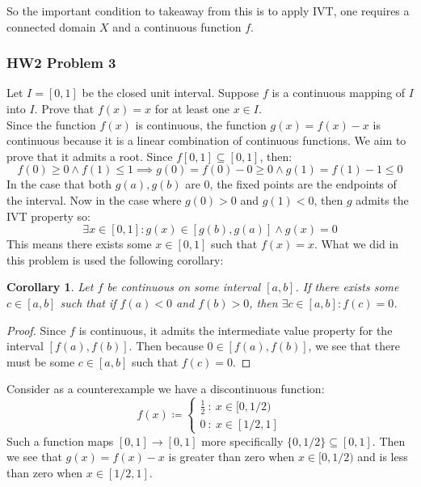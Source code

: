 \documentclass[10pt,letterpaper]{article} %
\newtheorem{cor}{Corollary}[section]
\begin{document}
So the important condition to takeaway from this is to apply IVT, one requires a connected domain $X$ and a continuous function $f$. 

\medskip
\subsubsection{HW2 Problem 3}
Let $I = [0, 1]$ be the closed unit interval. Suppose $f$ is a continuous mapping of $I$ into $I$. Prove that $f(x) = x$ for at least one $x \in I$.\\

Since the function $f(x)$ is continuous, the function $g(x) = f(x) - x$ is continuous because it is a linear combination of continuous functions. We aim to prove that it admits a root. Since $f[0, 1] \subseteq [0, 1]$, then:
\begin{equation*}
f(0) \geqslant 0 \land f(1) \leqslant 1 \implies g(0) = f(0) - 0 \geqslant 0 \land g(1) = f(1) - 1 \leqslant 0
\end{equation*}
In the case that both $g(a), g(b)$ are 0, the fixed points are the endpoints of the interval. Now in the case where $g(0) > 0$ and $g(1) < 0$, then $g$ admits the IVT property so:
\begin{equation*}
\exists x \in [0, 1]: g(x) \in [g(b), g(a)] \land g(x) = 0
\end{equation*}
This means there exists some $x \in [0, 1]$ such that $f(x) = x$. What we did in this problem is used the following corollary:
\begin{cor}
Let $f$ be continuous on some interval $[a, b]$. If there exists some $c \in [a, b]$ such that if $f(a) < 0$ and $f(b) > 0$, then $\exists c \in [a, b]: f(c) = 0$.
\end{cor}
\begin{proof}
Since $f$ is continuous, it admits the intermediate value property for the interval $[f(a), f(b)]$. Then because $0 \in [f(a), f(b)]$, we see that there must be some $c \in [a, b]$ such that $f(c) = 0$.
\end{proof}

Consider as a counterexample we have a discontinuous function:
\begin{equation*}
f(x) \coloneq \begin{cases*}
  \frac{1}{2} \ : \ x \in [0, 1/2)\\
  0 \ : \ x \in [1/2, 1]
\end{cases*}
\end{equation*}
Such a function maps $[0, 1] \xrightarrow{} [0, 1]$ more specifically $\{0, 1/2\} \subseteq [0, 1]$. Then we see that $g(x) = f(x) - x$ is greater than zero when $x \in [0, 1/2)$ and is less than zero when $x \in [1/2, 1]$.\\
\end{document}
